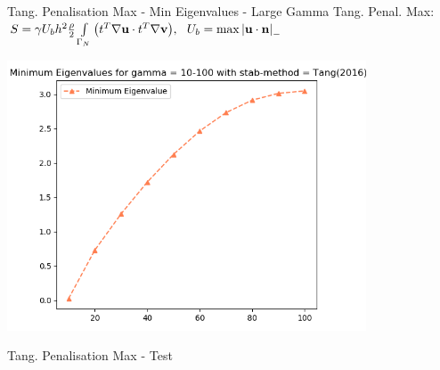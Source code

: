 \begin{frame}{Tang. Penalisation Max - Min Eigenvalues - Large Gamma}
Tang. Penal. Max: \(      S = \gamma U_b h^2 \frac{\rho}{2} \int\limits_{\Gamma_{N}} \qty(t^{T}\nabla{\textbf{u}} \cdot t^{T}\nabla{\textbf{v}}),  ~~U_b = \max \abs{{\textbf{u}} \cdot {\textbf{n}}}_-\)
    \begin{center}
        \includegraphics[width=0.8\textwidth]{Media/Gamma_10_thru_100_tang(2016)_min.png}
    \end{center}
\end{frame}

\begin{frame}{Tang. Penalisation Max - Test}
    \begin{center}
\end{center}
\end{frame}

